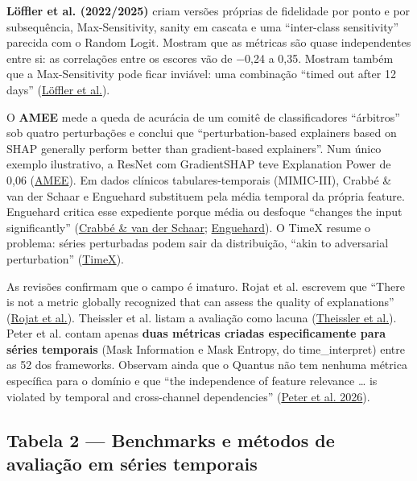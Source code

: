 \documentclass[11pt,a4paper]{article}
\begin{document}
\textbf{Löffler et al. (2022/2025)} criam versões próprias de fidelidade por ponto e por subsequência, Max-Sensitivity, sanity em cascata e uma ``inter-class sensitivity'' parecida com o Random Logit. Mostram que as métricas são quase independentes entre si: as correlações entre os escores vão de −0,24 a 0,35. Mostram também que a Max-Sensitivity pode ficar inviável: uma combinação ``timed out after 12 days'' (\href{https://arxiv.org/abs/2203.07861}{Löffler et al.}).

O \textbf{AMEE} mede a queda de acurácia de um comitê de classificadores ``árbitros'' sob quatro perturbações e conclui que ``perturbation-based explainers based on SHAP generally perform better than gradient-based explainers''. Num único exemplo ilustrativo, a ResNet com GradientSHAP teve Explanation Power de 0,06 (\href{https://arxiv.org/abs/2306.05501}{AMEE}). Em dados clínicos tabulares-temporais (MIMIC-III), Crabbé \& van der Schaar e Enguehard substituem pela média temporal da própria feature. Enguehard critica esse expediente porque média ou desfoque ``changes the input significantly'' (\href{https://arxiv.org/abs/2106.05303}{Crabbé \& van der Schaar}; \href{https://arxiv.org/abs/2305.18840}{Enguehard}). O TimeX resume o problema: séries perturbadas podem sair da distribuição, ``akin to adversarial perturbation'' (\href{https://arxiv.org/abs/2306.02109}{TimeX}).

As revisões confirmam que o campo é imaturo. Rojat et al. escrevem que ``There is not a metric globally recognized that can assess the quality of explanations'' (\href{https://arxiv.org/abs/2104.00950}{Rojat et al.}). Theissler et al. listam a avaliação como lacuna (\href{https://kops.uni-konstanz.de/handle/123456789/59034}{Theissler et al.}). Peter et al. contam apenas \textbf{duas métricas criadas especificamente para séries temporais} (Mask Information e Mask Entropy, do time\_interpret) entre as 52 dos frameworks. Observam ainda que o Quantus não tem nenhuma métrica específica para o domínio e que ``the independence of feature relevance … is violated by temporal and cross-channel dependencies'' (\href{https://arxiv.org/abs/2608.21449}{Peter et al. 2026}).

\subsection{Tabela 2 — Benchmarks e métodos de avaliação em séries temporais}
\end{document}

